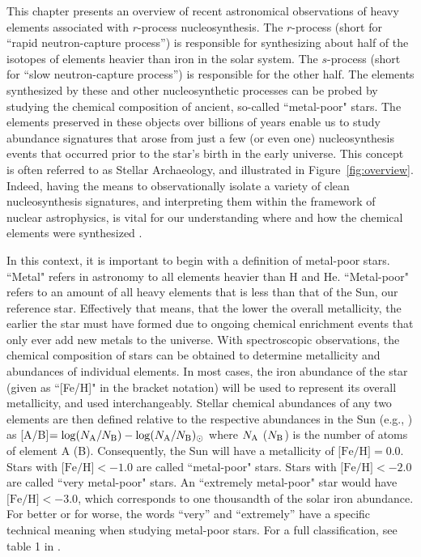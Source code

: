 \documentclass[letterpaper]{article}
\begin{document}
This chapter presents an overview of recent astronomical observations of heavy elements associated with $r$-process nucleosynthesis. The $r$-process (short for ``rapid neutron-capture process'') is responsible for synthesizing about half of the isotopes of elements heavier than iron in the solar system. The $s$-process (short for ``slow neutron-capture process'') is responsible for the other half.
The elements synthesized by these and other nucleosynthetic processes can be probed by studying the chemical composition of ancient, so-called ``metal-poor" stars. The elements preserved in these objects over billions of years enable us to study abundance signatures that arose from just a few (or even one) nucleosynthesis events that occurred prior to the star's birth in the early universe. This concept is often referred to as Stellar Archaeology, and illustrated in Figure~\ref{fig:overview}.
Indeed, having the means to observationally isolate a variety of clean nucleosynthesis signatures, and interpreting them within the framework of nuclear astrophysics, is vital for our understanding where and how the chemical elements were synthesized \citep{Frebel2015}.


In this context, it is important to begin with a definition of metal-poor stars. ``Metal" refers in astronomy to all elements heavier than H and He. ``Metal-poor" refers to an amount of all heavy elements that is less than that of the Sun, our reference star. Effectively that means, that the lower the overall metallicity, the earlier the star must have formed due to ongoing chemical enrichment events that only ever add new metals to the universe. With spectroscopic observations, the chemical composition of stars can be obtained to determine metallicity and abundances of individual elements. In most cases, the iron abundance of the star (given as ``[Fe/H]" in the bracket notation) will be used to represent its overall metallicity, and used interchangeably. Stellar chemical abundances of any two elements are then defined relative to the respective abundances in the Sun (e.g., \citealt{Asplund2009}) as \mbox{[A/B]}$
= \log(N_{\rm A}/N_{\rm B}) - \log(N_{\rm A}/N_{\rm B})_\odot$ where
$N_{\rm {A}}$ ($N_{\rm {B}}$) is the number of atoms of element A (B). Consequently, the Sun will have a metallicity of $\mbox{[Fe/H]}=0.0$. Stars with $\mbox{[Fe/H]}<-1.0$ are called ``metal-poor" stars. Stars with $\mbox{[Fe/H]}<-2.0$ are called ``very metal-poor" stars. An ``extremely metal-poor" star would have $\mbox{[Fe/H]}<-3.0$, which corresponds to one thousandth of the solar iron abundance. For better or for worse, the words ``very'' and ``extremely'' have a specific technical meaning when studying metal-poor stars. For a full classification, see table 1 in \citealt{Frebel2018}.
\end{document}
